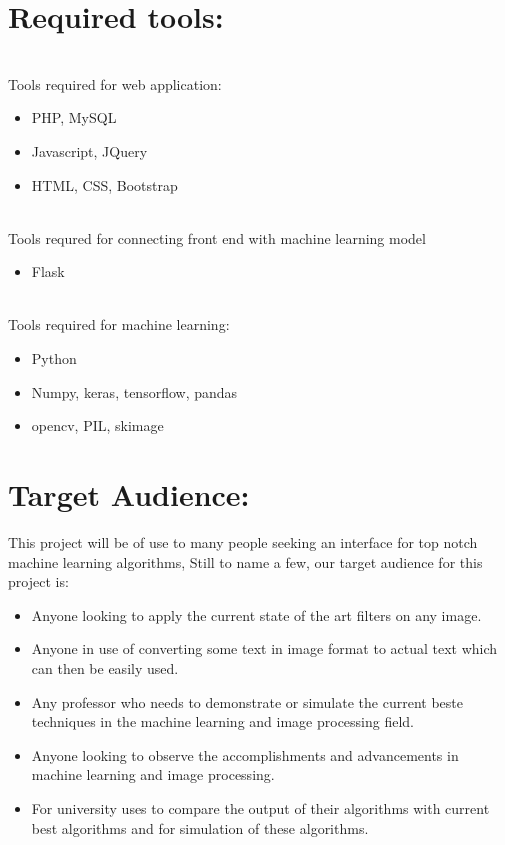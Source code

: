 \documentclass[journal]{IEEEtran}
\begin{document}
\section{Required tools:}
\\
Tools required for web application:
\begin{itemize}
    \item PHP, MySQL
    \item Javascript, JQuery
    \item HTML, CSS, Bootstrap
\end{itemize}
\\
Tools requred for connecting front end with machine learning model
\begin{itemize}
    \item Flask
\end{itemize}
\\
Tools required for machine learning:
\begin{itemize}
    \item Python
    \item Numpy, keras, tensorflow, pandas
    \item opencv, PIL, skimage
\end{itemize}

\section{Target Audience:}
This project will be of use to many people seeking an interface for top notch machine learning algorithms, Still to name a few, our target audience for this project is:
\begin{itemize}
    \item Anyone looking to apply the current state of the art filters on any image.
    \item Anyone in use of converting some text in image format to actual text which can then be easily used.
    \item Any professor who needs to demonstrate or simulate the current beste techniques in the machine learning and image processing field.
    \item Anyone looking to observe the accomplishments and advancements in machine learning and image processing.
    \item For university uses to compare the output of their algorithms with current best algorithms and for simulation of these algorithms.
\end{itemize}


 
\end{document}
